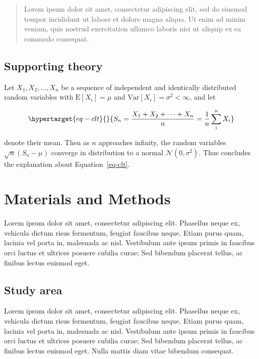\documentclass[
  oneside,
  open=any]{scrbook}
\begin{document}
\begin{quote}
Lorem ipsum dolor sit amet, consectetur adipiscing elit, sed do eiusmod
tempor incididunt ut labore et dolore magna aliqua. Ut enim ad minim
veniam, quis nostrud exercitation ullamco laboris nisi ut aliquip ex ea
commodo consequat.\\
\end{quote}

\hypertarget{supporting-theory}{%
\section{Supporting theory}\label{supporting-theory}}

Let \(X_1, X_2, \ldots, X_n\) be a sequence of independent and
identically distributed random variables with \(\text{E}[X_i] = \mu\)
and \(\text{Var}[X_i] = \sigma^2 < \infty\), and let

\begin{equation}\protect\hypertarget{eq-clt}{}{
S_n = \frac{X_1 + X_2 + \cdots + X_n}{n}
      = \frac{1}{n}\sum_{i}^{n} X_i
}\label{eq-clt}\end{equation}

denote their mean. Then as \(n\) approaches infinity, the random
variables \(\sqrt{n}(S_n - \mu)\) converge in distribution to a normal
\(\mathcal{N}(0, \sigma^2)\). Thus concludes the explanation about
Equation~\ref{eq-clt}.

\hypertarget{materials-and-methods}{%
\chapter{Materials and Methods}\label{materials-and-methods}}

Lorem ipsum dolor sit amet, consectetur adipiscing elit. Phasellus neque
ex, vehicula dictum risus fermentum, feugiat faucibus neque. Etiam purus
quam, lacinia vel porta in, malesuada ac nisl. Vestibulum ante ipsum
primis in faucibus orci luctus et ultrices posuere cubilia curae; Sed
bibendum placerat tellus, ac finibus lectus euismod eget.

\hypertarget{study-area}{%
\section{Study area}\label{study-area}}

Lorem ipsum dolor sit amet, consectetur adipiscing elit. Phasellus neque
ex, vehicula dictum risus fermentum, feugiat faucibus neque. Etiam purus
quam, lacinia vel porta in, malesuada ac nisl. Vestibulum ante ipsum
primis in faucibus orci luctus et ultrices posuere cubilia curae; Sed
bibendum placerat tellus, ac finibus lectus euismod eget. Nulla mattis
diam vitae bibendum consequat.
\end{document}

